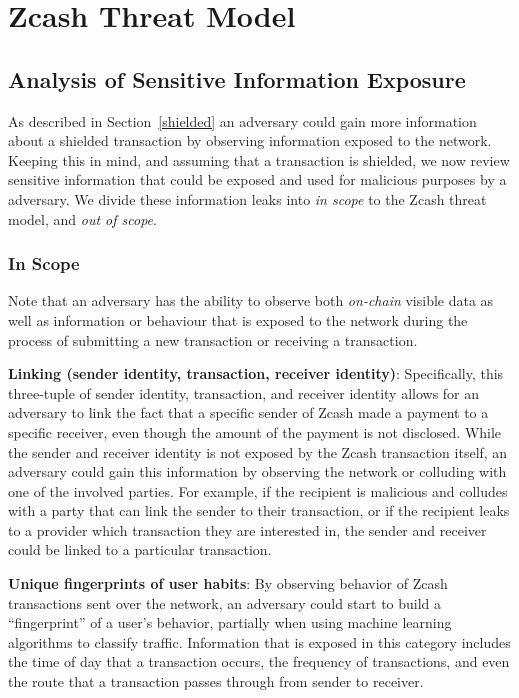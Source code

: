 \documentclass{article}
\begin{document}
\section{Zcash Threat Model}
\label{threat-model}

\subsection{Analysis of Sensitive Information Exposure}
As described in Section~\ref{shielded} an adversary could gain more information
about a shielded transaction by observing information exposed to the network.
Keeping this in mind, and assuming that a transaction is shielded, we now
review sensitive information that could be exposed and used for malicious
purposes by a adversary.
We divide these information leaks into \emph{in scope} to the Zcash threat
model, and \emph{out of scope}.

\subsubsection{In Scope}
\label{in-scope}

Note that an adversary has the ability to observe both \emph{on-chain} visible
data as well as information or behaviour that is exposed to the network during
the process of submitting a new transaction or receiving a transaction.

\textbf{Linking (sender identity, transaction, receiver identity)}:
Specifically, this three-tuple of sender identity, transaction, and receiver
identity allows for an adversary to link the fact that a
specific sender of Zcash made a payment to a specific receiver, even though the
amount of the payment is not disclosed. While the sender and receiver identity
is not exposed by the Zcash transaction itself, an adversary
could gain this information by observing the network or colluding
with one of the involved parties. For example, if the recipient is
malicious and colludes with a party that can link the sender to their
transaction, or if the recipient leaks to a provider which transaction they
are interested in, the sender and receiver could be linked to a particular
transaction.


\textbf{Unique fingerprints of user habits}: By observing behavior of Zcash
transactions sent over the network, an adversary could start to build a
“fingerprint” of a user’s behavior, partially when using machine learning
algorithms to classify traffic. Information that is exposed in this
category includes the time of day that a transaction occurs, the frequency
of transactions, and even the route that a transaction passes through from
sender to receiver.
\end{document}
